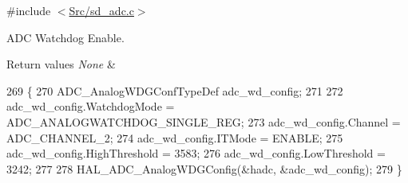 {\ttfamily \#include $<$\mbox{\hyperlink{sd__adc_8c}{Src/sd\+\_\+adc.\+c}}$>$}



A\+DC Watchdog Enable. 


\begin{DoxyRetVals}{Return values}
{\em None} & \\
\hline
\end{DoxyRetVals}

\begin{DoxyCode}
269 \{
270     ADC\_AnalogWDGConfTypeDef adc\_wd\_config;
271 
272     adc\_wd\_config.WatchdogMode = ADC\_ANALOGWATCHDOG\_SINGLE\_REG;
273     adc\_wd\_config.Channel = ADC\_CHANNEL\_2;
274     adc\_wd\_config.ITMode = ENABLE;
275     adc\_wd\_config.HighThreshold = 3583;
276     adc\_wd\_config.LowThreshold = 3242;
277 
278     HAL\_ADC\_AnalogWDGConfig(&hadc, &adc\_wd\_config);
279 \}
\end{DoxyCode}
